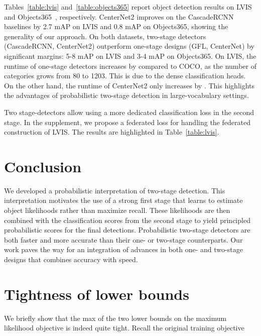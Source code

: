 \documentclass{article}
\newcommand{\name}{CenterNet2 }
\begin{document}
Tables~\ref{table:lvis} and~\ref{table:objects365} report object detection results on LVIS~\cite{gupta2019lvis} and Objects365~\cite{shao2019objects365}, respectively.
CenterNet2 improves on the CascadeRCNN baselines by 2.7 mAP on LVIS and 0.8 mAP on Objects365, showing the generality of our approach.
On both datasets, two-stage detectors (CascadeRCNN, CenterNet2) outperform one-stage designs (GFL, CenterNet) by significant margins: 5-8 mAP on LVIS and 3-4 mAP on Objects365.  
On LVIS, the runtime of one-stage detectors increases by  compared to COCO, as the number of categories grows from 80 to 1203. This is due to the dense classification heads.
On the other hand, the runtime of \name only increases by .
This highlights the advantages of probabilistic two-stage detection in large-vocabulary settings.

Two stage-detectors allow using a more dedicated classification loss in the second stage. In the supplement, we propose a federated loss for handling the federated construction of LVIS. The results are highlighted in Table~\ref{table:lvis}.

\section{Conclusion}

We developed a probabilistic interpretation of two-stage detection.
This interpretation motivates the use of a strong first stage that learns to estimate object likelihoods rather than maximize recall. 
These likelihoods are then combined with the classification scores from the second stage to yield principled probabilistic scores for the final detections.
Probabilistic two-stage detectors are both faster and more accurate than their one- or two-stage counterparts.
Our work paves the way for an integration of advances in both one- and two-stage designs
that combines accuracy with speed.


\nocite{langley00}




\normalsize
{}
\clearpage
\appendix


\section{Tightness of lower bounds}

We briefly show that the max of the two lower bounds on the maximum likelihood objective is  indeed quite tight.
Recall the original training objective
\end{document}
